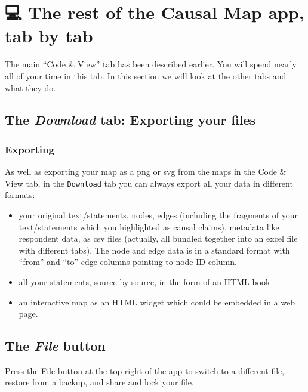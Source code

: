 \documentclass[
]{book}
\providecommand{\tightlist}{%
  \setlength{\itemsep}{0pt}\setlength{\parskip}{0pt}}
\begin{document}
\hypertarget{restoftheapp}{%
\chapter{💻 The rest of the Causal Map app, tab by tab}\label{restoftheapp}}

The main ``Code \& View'' tab has been described earlier. You will spend nearly all of your time in this tab. In this section we will look at the other tabs and what they do.

\hypertarget{the-download-tab-exporting-your-files}{%
\section{\texorpdfstring{The \emph{Download} tab: Exporting your files}{The Download tab: Exporting your files}}\label{the-download-tab-exporting-your-files}}

\hypertarget{exporting}{%
\subsection{Exporting}\label{exporting}}

As well as exporting your map as a png or svg from the maps in the Code \& View tab, in the \texttt{Download} tab you can always export all your data in different formats:

\begin{itemize}
\tightlist
\item
  your original text/statements, nodes, edges (including the fragments of your text/statements which you highlighted as causal claims), metadata like respondent data, as csv files (actually, all bundled together into an excel file with different tabs). The node and edge data is in a standard format with ``from'' and ``to'' edge columns pointing to node ID column.
\item
  all your statements, source by source, in the form of an HTML book
\item
  an interactive map as an HTML widget which could be embedded in a web page.
\end{itemize}

\hypertarget{the-file-button}{%
\section{\texorpdfstring{The \emph{File} button}{The File button}}\label{the-file-button}}

Press the File button at the top right of the app to switch to a different file, restore from a backup, and share and lock your file.
\end{document}
